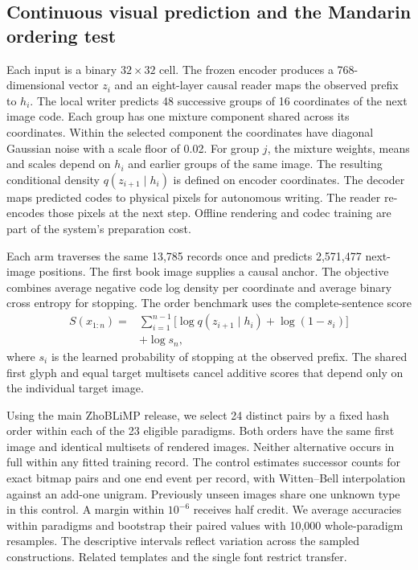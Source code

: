 \subsection*{Continuous visual prediction and the Mandarin ordering test}
Each input is a binary $32\times32$ cell. The frozen encoder produces
a 768-dimensional vector $z_i$ and an eight-layer causal reader maps the
observed prefix to $h_i$. The local writer predicts 48 successive groups of
16 coordinates of the next image code. Each group has one mixture component
shared across its coordinates. Within the selected component the coordinates
have diagonal Gaussian noise with a scale floor of 0.02. For group $j$,
the mixture weights, means and scales depend on $h_i$ and earlier groups
of the same image. The resulting conditional density $q(z_{i+1}\mid h_i)$
is defined on encoder coordinates. The decoder maps predicted codes to
physical pixels for autonomous writing. The reader re-encodes those pixels
at the next step. Offline rendering and codec training are part of the
system's preparation cost.

Each arm traverses the same 13,785 records once and predicts 2,571,477
next-image positions. The first book image supplies a causal anchor.
The objective combines average negative code log density per coordinate
and average binary cross entropy for stopping. The order benchmark uses the
complete-sentence score
\begin{align}
 S(x_{1:n})={}&\sum_{i=1}^{n-1}\bigl[\log q(z_{i+1}\mid h_i)
                   +\log(1-s_i)\bigr] \nonumber\\
              &+\log s_n ,
\end{align}
where $s_i$ is the learned probability of stopping at the observed prefix.
The shared first glyph and equal target multisets cancel additive scores
that depend only on the individual target image.

Using the main ZhoBLiMP release\cite{zhoblimp}, we select 24 distinct pairs
by a fixed hash order within each of the 23 eligible paradigms. Both orders
have the same first image and identical multisets of rendered images.
Neither alternative occurs in full within any fitted training record.
The control estimates successor counts for exact bitmap pairs and one end
event per record, with Witten--Bell interpolation against an add-one unigram.
Previously unseen images share one unknown type in this control.
A margin within $10^{-6}$ receives half credit. We average accuracies within
paradigms and bootstrap their paired values with 10,000 whole-paradigm
resamples. The descriptive intervals reflect variation across the sampled
constructions. Related templates and the single font restrict transfer.
